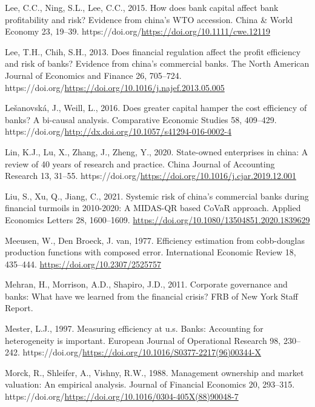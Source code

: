 \documentclass[
  12pt,
  a4paper,
  DIV=11,
  numbers=noendperiod]{scrreprt}
\newlength{\cslhangindent}
\newenvironment{CSLReferences}[2] %
 {\begin{list}{}{%
  \setlength{\itemindent}{0pt}
  \setlength{\leftmargin}{0pt}
  \setlength{\parsep}{0pt}
  \ifodd #1
   \setlength{\leftmargin}{\cslhangindent}
   \setlength{\itemindent}{-1\cslhangindent}
  \fi
  \setlength{\itemsep}{#2\baselineskip}}}
 {\end{list}}
\begin{document}
\begin{CSLReferences}{1}{0}
Lee, C.C., Ning, S.L., Lee, C.C., 2015. How does bank capital affect
bank profitability and risk? Evidence from china's WTO accession. China
\& World Economy 23, 19--39.
https://doi.org/\url{https://doi.org/10.1111/cwe.12119}

Lee, T.H., Chih, S.H., 2013. Does financial regulation affect the profit
efficiency and risk of banks? Evidence from china's commercial banks.
The North American Journal of Economics and Finance 26, 705--724.
https://doi.org/\url{https://doi.org/10.1016/j.najef.2013.05.005}

Lešanovská, J., Weill, L., 2016. Does greater capital hamper the cost
efficiency of banks? A bi-causal analysis. Comparative Economic Studies
58, 409--429.
https://doi.org/\url{http://dx.doi.org/10.1057/s41294-016-0002-4}

Lin, K.J., Lu, X., Zhang, J., Zheng, Y., 2020. State-owned enterprises
in china: A review of 40 years of research and practice. China Journal
of Accounting Research 13, 31--55.
https://doi.org/\url{https://doi.org/10.1016/j.cjar.2019.12.001}

Liu, S., Xu, Q., Jiang, C., 2021. Systemic risk of china's commercial
banks during financial turmoils in 2010-2020: A MIDAS-QR based CoVaR
approach. Applied Economics Letters 28, 1600--1609.
\url{https://doi.org/10.1080/13504851.2020.1839629}

Meeusen, W., Den Broeck, J. van, 1977. Efficiency estimation from
cobb-douglas production functions with composed error. International
Economic Review 18, 435--444. \url{https://doi.org/10.2307/2525757}

Mehran, H., Morrison, A.D., Shapiro, J.D., 2011. Corporate governance
and banks: What have we learned from the financial crisis? FRB of New
York Staff Report.

Mester, L.J., 1997. Measuring efficiency at u.s. Banks: Accounting for
heterogeneity is important. European Journal of Operational Research 98,
230--242.
https://doi.org/\url{https://doi.org/10.1016/S0377-2217(96)00344-X}

Morck, R., Shleifer, A., Vishny, R.W., 1988. Management ownership and
market valuation: An empirical analysis. Journal of Financial Economics
20, 293--315.
https://doi.org/\url{https://doi.org/10.1016/0304-405X(88)90048-7}


\end{CSLReferences}
\end{document}
